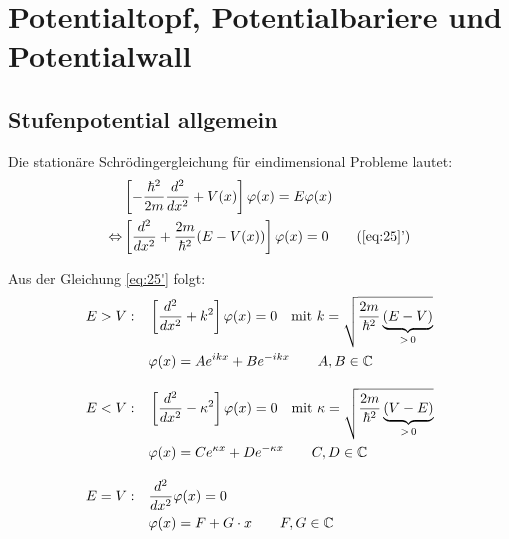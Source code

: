 
\graphicspath{{sgl_potential_pics/}}%


\setcounter{section}{1}
\section*{Potentialtopf, Potentialbariere und Potentialwall}


\subsection{Stufenpotential allgemein}

Die stationäre Schrödingergleichung für eindimensional Probleme lautet:
\begin{align} 
  &\left[-\frac{\hbar^2}{2m}\frac{d^2}{dx^2}+V(x)\right]\varphi(x)
  =E\varphi(x)\label{eq:25}\\
  \Leftrightarrow &\left[\frac{d^2}{dx^2} 
    +\frac{2m}{\hbar^2}(E-V(x))\right]\varphi(x)=0 
  \tag{\ref{eq:25}'}\label{eq:25'} 
\end{align}

Aus der Gleichung \eqref{eq:25'} folgt:
\begin{subequations}
  \label{eq:27}
  \begin{align}
    E>V: \quad &\left[\frac{d^2}{dx^2}+k^2\right]\varphi(x)=0 
    \quad \textrm{mit } k=\sqrt{\frac{2m}{\hbar^2}\underbrace{(E-V)}_{>\,0}} \notag \\
    &\varphi(x)=Ae^{ikx}+Be^{-ikx}  
    \qquad  A,B \in \mathbb{C} \label{eq:27a} \\[2ex]
    E<V: \quad &\left[\frac{d^2}{dx^2}-\kappa^2\right]\varphi(x)=0
    \quad  \textrm{mit } \kappa=\sqrt{\frac{2m}{\hbar^2}\underbrace{(V-E)}_{>\,0}} \notag \\
    &\varphi(x)=Ce^{\kappa x}+De^{-\kappa x}  
    \qquad  C,D \in \mathbb{C} \label{eq:27b}\\[2ex]
    E=V: \quad &\frac{d^2}{dx^2}\varphi(x)=0 \notag \\
    &\varphi(x)=F+G\cdot x   
    \qquad  F,G \in \mathbb{C} \label{eq:27c}
  \end{align}
\end{subequations}


